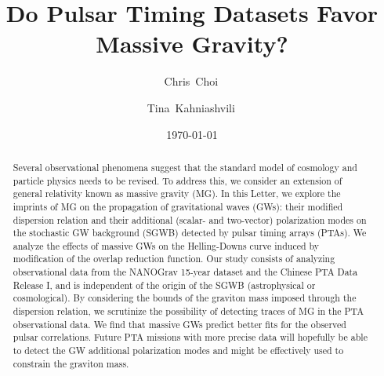 \documentclass[prd,twocolumn,aps,psfig,nofootinbib,nobibnotes,superscriptaddress,preprintnumbers,times]{revtex4-2}
\begin{document}
\title{Do Pulsar Timing Datasets Favor Massive Gravity?}

\date{\today}
\author{Chris~Choi\,}

\author{Tina~Kahniashvili\,}

\begin{abstract}

Several observational phenomena suggest that the standard model of cosmology and particle physics needs to be revised. To address this, we consider an extension of general relativity known as massive gravity (MG). In this Letter, we explore the imprints of MG on the propagation of gravitational waves (GWs): their modified dispersion relation and their additional (scalar- and two-vector) polarization modes on the stochastic GW background (SGWB) detected by pulsar timing arrays (PTAs). We analyze the effects of massive GWs on the Helling-Downs curve induced by modification of the overlap reduction function. Our study consists of analyzing observational data from the NANOGrav 15-year dataset and the Chinese PTA Data Release I, and is independent of the origin of the SGWB (astrophysical or cosmological).  
By considering the bounds of the graviton mass imposed through the dispersion relation, 
we scrutinize the possibility of detecting traces of MG in the PTA observational data.  
We find that massive GWs predict better fits for the observed pulsar correlations. Future PTA missions with more precise data will hopefully be able to detect the GW additional polarization modes and might be effectively used to constrain the graviton mass.
\end{abstract}

\maketitle
\end{document}
